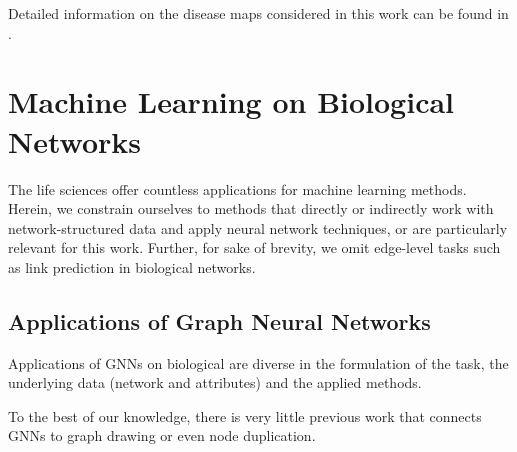 \documentclass[
	fontsize=10pt, %
	twoside=false, %
	secnumdepth=1, %
  toc=indentunnumbered %
]{kaobook}
\begin{document}
\cite{sompairac_metabolic_2019}


Detailed information on
the disease maps considered in this work can be found in .






\section{Machine Learning on Biological Networks}
\label{sec:machine-learning}

The life sciences offer countless applications for machine learning methods.
Herein, we constrain ourselves to methods that directly or indirectly work with
network-structured data and apply neural network techniques, or are particularly
relevant for this work. Further, for sake of brevity, we omit edge-level tasks such as
link prediction in biological networks.



\subsection{Applications of Graph Neural Networks}
\label{sec:gnn-applications}

Applications of GNNs on biological are diverse in the formulation of the task,
the underlying data (network and attributes) and the applied methods.

To the best of our knowledge, there is very little previous work that connects
GNNs to graph drawing or even node duplication. 
\end{document}
